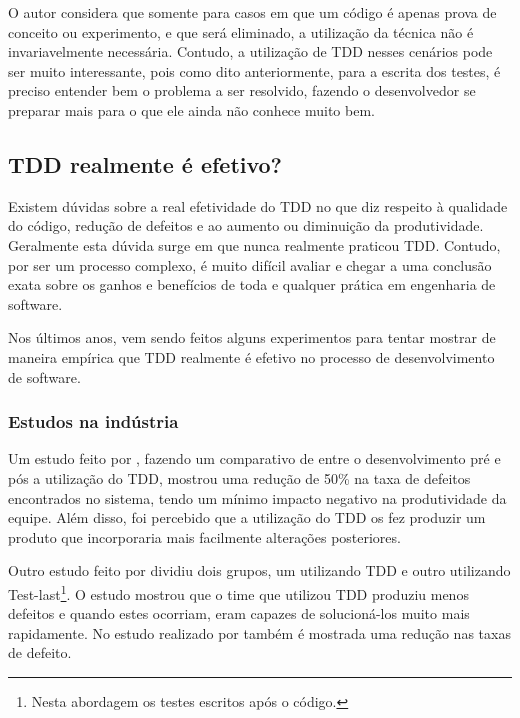 O autor considera que somente para casos em que um código é apenas prova de conceito ou experimento, e que será eliminado, a utilização da técnica não é invariavelmente necessária. Contudo, a utilização de TDD nesses cenários pode ser muito interessante, pois como dito anteriormente, para a escrita dos testes, é preciso entender bem o problema a ser resolvido, fazendo o desenvolvedor se preparar mais para o que ele ainda não conhece muito bem.


\subsection{TDD realmente é efetivo?} %
\label{sub:tdd_realmente_e_efetivo}

Existem dúvidas sobre a real efetividade do TDD no que diz respeito à qualidade do código, redução de defeitos e ao aumento ou diminuição da produtividade. Geralmente esta dúvida surge em que nunca realmente praticou TDD. Contudo, por ser um processo complexo, é muito difícil avaliar e chegar a uma conclusão exata sobre os ganhos e benefícios de toda e qualquer prática em engenharia de software.

Nos últimos anos, vem sendo feitos alguns experimentos para tentar mostrar de maneira empírica que TDD realmente é efetivo no processo de desenvolvimento de software.

\subsubsection{Estudos na indústria} %
\label{sub:estudos_na_industria}

Um estudo feito por , fazendo um comparativo de entre o desenvolvimento pré e pós a utilização do TDD, mostrou uma redução de 50\% na taxa de defeitos encontrados no sistema, tendo um mínimo impacto negativo na produtividade da equipe. Além disso, foi percebido que a utilização do TDD os fez produzir um produto que incorporaria mais facilmente alterações posteriores.

Outro estudo feito por  dividiu dois grupos, um utilizando TDD e outro utilizando Test-last\footnote{Nesta abordagem os testes escritos após o código.}. O estudo mostrou que o time que utilizou TDD produziu menos defeitos e quando estes ocorriam, eram capazes de solucioná-los muito mais rapidamente. No estudo realizado por  também é mostrada uma redução nas taxas de defeito.

